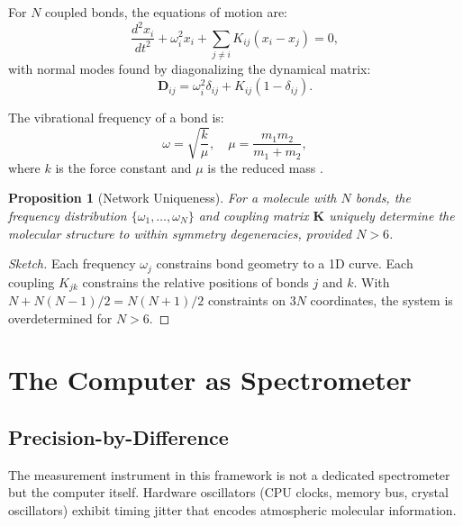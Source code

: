 \documentclass[twocolumn,10pt]{article}
\newtheorem{proposition}[theorem]{Proposition}
\theoremstyle{definition}
\begin{document}
For $N$ coupled bonds, the equations of motion are:
\begin{equation}\label{eq:coupled_bonds}
    \frac{d^2x_i}{dt^2} + \omega_i^2 x_i + \sum_{j \neq i} K_{ij}(x_i - x_j) = 0,
\end{equation}
with normal modes found by diagonalizing the dynamical matrix:
\begin{equation}\label{eq:dynamical_matrix}
    \mathbf{D}_{ij} = \omega_i^2\delta_{ij} + K_{ij}(1 - \delta_{ij}).
\end{equation}

The vibrational frequency of a bond is:
\begin{equation}\label{eq:bond_freq}
    \omega = \sqrt{\frac{k}{\mu}}, \quad \mu = \frac{m_1 m_2}{m_1 + m_2},
\end{equation}
where $k$ is the force constant and $\mu$ is the reduced mass \citep{Herzberg1945, Wilson1955}.

\begin{proposition}[Network Uniqueness]\label{prop:network_unique}
For a molecule with $N$ bonds, the frequency distribution $\{\omega_1, \ldots, \omega_N\}$ and coupling matrix $\mathbf{K}$ uniquely determine the molecular structure to within symmetry degeneracies, provided $N > 6$.
\end{proposition}

\begin{proof}[Sketch]
Each frequency $\omega_j$ constrains bond geometry to a 1D curve. Each coupling $K_{jk}$ constrains the relative positions of bonds $j$ and $k$. With $N + N(N-1)/2 = N(N+1)/2$ constraints on $3N$ coordinates, the system is overdetermined for $N > 6$.
\end{proof}

\section{The Computer as Spectrometer}\label{sec:computer_spectrometer}

\subsection{Precision-by-Difference}\label{subsec:precision_by_diff}

The measurement instrument in this framework is not a dedicated spectrometer but the computer itself. Hardware oscillators (CPU clocks, memory bus, crystal oscillators) exhibit timing jitter that encodes atmospheric molecular information.
\end{document}
